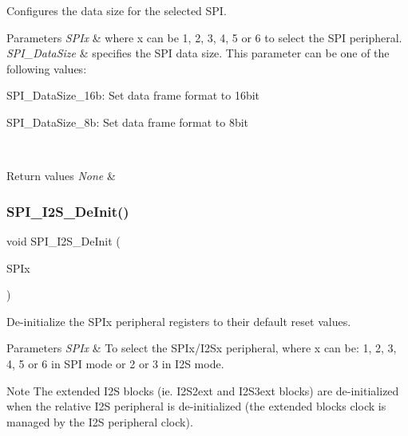 Configures the data size for the selected S\+PI. 


\begin{DoxyParams}{Parameters}
{\em S\+P\+Ix} & where x can be 1, 2, 3, 4, 5 or 6 to select the S\+PI peripheral. \\
\hline
{\em S\+P\+I\+\_\+\+Data\+Size} & specifies the S\+PI data size. This parameter can be one of the following values\+: \begin{DoxyItemize}
\item S\+P\+I\+\_\+\+Data\+Size\+\_\+16b\+: Set data frame format to 16bit \item S\+P\+I\+\_\+\+Data\+Size\+\_\+8b\+: Set data frame format to 8bit \end{DoxyItemize}
\\
\hline
\end{DoxyParams}

\begin{DoxyRetVals}{Return values}
{\em None} & \\
\hline
\end{DoxyRetVals}
\mbox{\label{group___s_p_i___group1_gabe36880945fa56785283a9c0092124cc}} 
\subsubsection{\texorpdfstring{S\+P\+I\+\_\+\+I2\+S\+\_\+\+De\+Init()}{SPI\_I2S\_DeInit()}}
{\footnotesize\ttfamily void S\+P\+I\+\_\+\+I2\+S\+\_\+\+De\+Init (\begin{DoxyParamCaption}\item[{S\+P\+I\+\_\+\+Type\+Def $\ast$}]{S\+P\+Ix }\end{DoxyParamCaption})}



De-\/initialize the S\+P\+Ix peripheral registers to their default reset values. 


\begin{DoxyParams}{Parameters}
{\em S\+P\+Ix} & To select the S\+P\+Ix/\+I2\+Sx peripheral, where x can be\+: 1, 2, 3, 4, 5 or 6 in S\+PI mode or 2 or 3 in I2S mode. ~\newline
 \\
\hline
\end{DoxyParams}
\begin{DoxyNote}{Note}
The extended I2S blocks (ie. I2\+S2ext and I2\+S3ext blocks) are de-\/initialized when the relative I2S peripheral is de-\/initialized (the extended block\textquotesingle{}s clock is managed by the I2S peripheral clock).
\end{DoxyNote}

